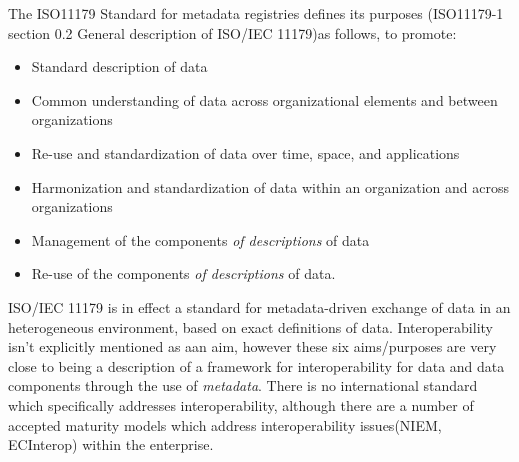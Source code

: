 \documentclass{llncs}
\begin{document}
The ISO11179 Standard for metadata registries defines its purposes (ISO11179-1 section 0.2 General description of ISO/IEC 11179)as follows,
\newline
to promote:
\begin{itemize}
\item Standard description of data
\item Common understanding of data across organizational elements and between organizations
\item Re-use and standardization of data over time, space, and applications
\item Harmonization and standardization of data within an organization and across organizations
\item Management of the components \emph{of descriptions} of data
\item Re-use of the components \emph{of descriptions} of data.
\end{itemize}
ISO/IEC 11179 is in effect a standard for metadata-driven exchange of data in an heterogeneous environment, based on exact definitions of data. Interoperability isn't explicitly mentioned as aan aim, however these six aims/purposes are very close to being a description of a framework for interoperability for data and data components through the use of \emph{metadata}. There is no international standard which specifically addresses interoperability, although there are a number of accepted maturity models which address interoperability issues(NIEM, ECInterop) within the enterprise.  %
\end{document}

